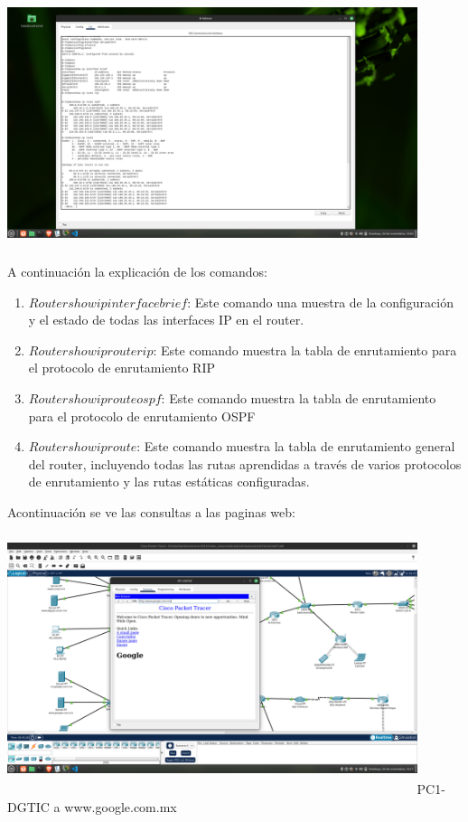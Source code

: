 \documentclass[14pt]{book}
\begin{document}
\includegraphics[width=12cm, height=8cm]{images/comandos TELMEX.png}\\

A continuación la explicación de los comandos:\\
\begin{enumerate}
  \item $Router show ip interface brief$: Este comando una muestra de la configuración y el estado de todas las interfaces IP en el router.
  \item $Router show ip route rip$: Este comando muestra la tabla de enrutamiento para el protocolo de enrutamiento RIP 
  \item $Router show ip route ospf$: Este comando muestra la tabla de enrutamiento para el protocolo de enrutamiento OSPF 
  \item $Router show ip route$: Este comando muestra la tabla de enrutamiento general del router, incluyendo todas las rutas aprendidas a través de varios protocolos de enrutamiento y las rutas estáticas configuradas.
\end{enumerate}

Acontinuación se ve las consultas a las paginas web:\\

\includegraphics[width=12cm, height=8cm]{images/captura1.png}PC1-DGTIC a www.google.com.mx\\
\end{document}
